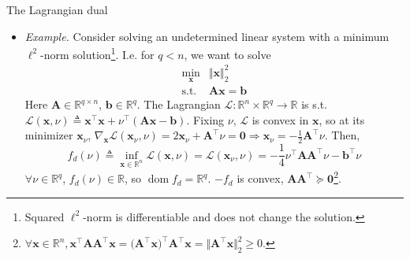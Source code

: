 \documentclass{beamer}
\numberwithin{equation}{section}
\begin{document}
\begin{frame}{The Lagrangian dual}
    \begin{itemize}
        \item
        \textit{Example.} Consider solving an undetermined linear system with
        a minimum $ \ell^2 $-norm solution\footnote{
            Squared $ \ell^2 $-norm is differentiable and does not change the
            solution.
        }. I.e. for $ q < n $, we want to
        solve
        \begin{equation*}
            \begin{array}{ll}
                \displaystyle\min_\mathbf{x} & \Vert\mathbf{x}\Vert_2^2 \\
                \text{s.t.} & \mathbf{Ax} = \mathbf{b}
            \end{array}
        \end{equation*}
        Here $ \mathbf{A} \in \mathbb{R}^{q \times n} $, $ \mathbf{b} \in
        \mathbb{R}^q $. The Lagrangian $ \mathcal{L} : \mathbb{R}^n \times
        \mathbb{R}^q \rightarrow \mathbb{R} $ is s.t.
        $ \mathcal{L}(\mathbf{x}, \nu) \triangleq \mathbf{x}^\top\mathbf{x} 
        + \nu^\top(\mathbf{Ax} - \mathbf{b}) $. Fixing $ \nu $, $ \mathcal{L} $
        is convex in $ \mathbf{x} $, so at its minimizer $ \mathbf{x}_\nu $,
        $ \nabla_\mathbf{x}\mathcal{L}(\mathbf{x}_\nu, \nu) =
        2\mathbf{x}_\nu + \mathbf{A}^\top\nu = \mathbf{0} \Rightarrow
        \mathbf{x}_\nu = -\frac{1}{2}\mathbf{A}^\top\nu $. Then,
        \begin{equation*}
            f_d(\nu) \triangleq \inf_{\mathbf{x} \in \mathbb{R}^n}
                \mathcal{L}(\mathbf{x}, \nu) =
                \mathcal{L}(\mathbf{x}_\nu, \nu) =
                -\frac{1}{4}\nu^\top\mathbf{AA}^\top\nu - \mathbf{b}^\top\nu
        \end{equation*}
        $ \forall \nu \in \mathbb{R}^q $, $ f_d(\nu) \in \mathbb{R} $, so
        $ \operatorname{dom}f_d = \mathbb{R}^q $. $ -f_d $ is convex,
        $ \mathbf{AA}^\top \succeq \mathbf{0} $\footnote{
            $ \forall \mathbf{x} \in \mathbb{R}^n,
            \mathbf{x}^\top\mathbf{AA}^\top\mathbf{x} =
            \big(\mathbf{A}^\top\mathbf{x}\big)^\top\mathbf{A}^\top\mathbf{x} =
            \Vert\mathbf{A}^\top\mathbf{x}\Vert_2^2 \ge 0 $.
        }.
    \end{itemize}

    \medskip
\end{frame}
\end{document}
